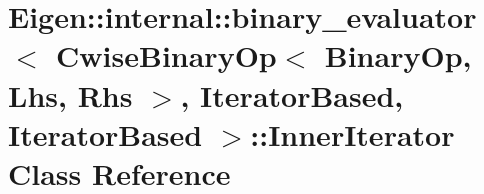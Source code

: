 \hypertarget{class_eigen_1_1internal_1_1binary__evaluator_3_01_cwise_binary_op_3_01_binary_op_00_01_lhs_00_01bbcbab6e07c6c8a44f9c2134b78b5906}{}\section{Eigen\+::internal\+::binary\+\_\+evaluator$<$ Cwise\+Binary\+Op$<$ Binary\+Op, Lhs, Rhs $>$, Iterator\+Based, Iterator\+Based $>$\+::Inner\+Iterator Class Reference}
\label{class_eigen_1_1internal_1_1binary__evaluator_3_01_cwise_binary_op_3_01_binary_op_00_01_lhs_00_01bbcbab6e07c6c8a44f9c2134b78b5906}
